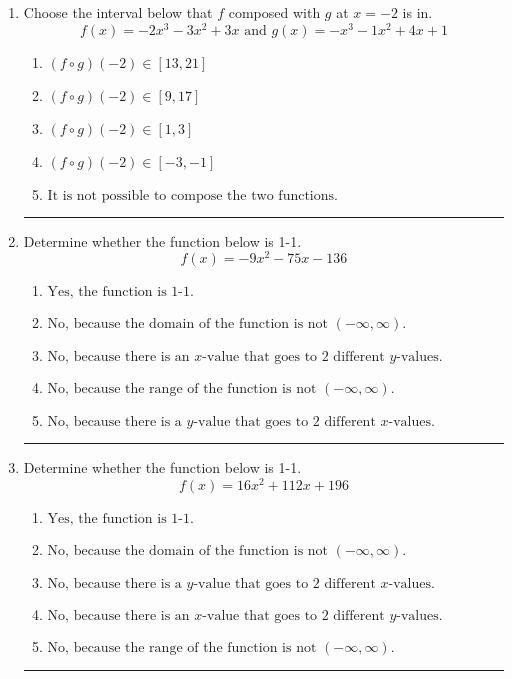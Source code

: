 \documentclass[14pt]{extbook}
\newcommand{\litem}[1]{\item#1\hspace*{-1cm}\rule{\textwidth}{0.4pt}}
\begin{document}
\begin{enumerate}
\litem{
Choose the interval below that $f$ composed with $g$ at $x=-2$ is in.\[ f(x) = -2x^{3} -3 x^{2} +3 x \text{ and } g(x) = -x^{3} -1 x^{2} +4 x + 1 \]\begin{enumerate}[label=\Alph*.]
\item \( (f \circ g)(-2) \in [13, 21] \)
\item \( (f \circ g)(-2) \in [9, 17] \)
\item \( (f \circ g)(-2) \in [1, 3] \)
\item \( (f \circ g)(-2) \in [-3, -1] \)
\item \( \text{It is not possible to compose the two functions.} \)

\end{enumerate} }
\litem{
Determine whether the function below is 1-1.\[ f(x) = -9 x^2 - 75 x - 136 \]\begin{enumerate}[label=\Alph*.]
\item \( \text{Yes, the function is 1-1.} \)
\item \( \text{No, because the domain of the function is not $(-\infty, \infty)$.} \)
\item \( \text{No, because there is an $x$-value that goes to 2 different $y$-values.} \)
\item \( \text{No, because the range of the function is not $(-\infty, \infty)$.} \)
\item \( \text{No, because there is a $y$-value that goes to 2 different $x$-values.} \)

\end{enumerate} }
\litem{
Determine whether the function below is 1-1.\[ f(x) = 16 x^2 + 112 x + 196 \]\begin{enumerate}[label=\Alph*.]
\item \( \text{Yes, the function is 1-1.} \)
\item \( \text{No, because the domain of the function is not $(-\infty, \infty)$.} \)
\item \( \text{No, because there is a $y$-value that goes to 2 different $x$-values.} \)
\item \( \text{No, because there is an $x$-value that goes to 2 different $y$-values.} \)
\item \( \text{No, because the range of the function is not $(-\infty, \infty)$.} \)


\end{enumerate}}
\end{enumerate}
\end{document}
